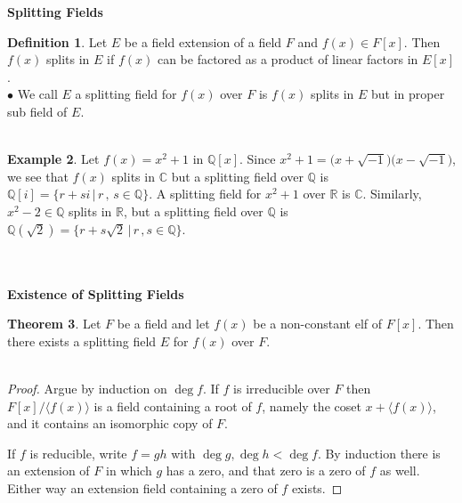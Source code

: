 \documentclass[11pt,a4paper]{article}
\theoremstyle{definition}
\newtheorem{thm}{Theorem}[subsection]
\newtheorem{defn}[thm]{Definition}
\newtheorem{exa}[thm]{Example}
\begin{document}
\textbf{Splitting Fields}\\

\begin{defn}
Let $E$ be a field extension of a field $F$ and $f(x)\in F[x]$. Then $f(x)$ splits in $E$ if $f(x)$ can be factored as a product of linear factors in $E[x]$.\\

$\bullet$ We call $E$ a splitting field for $f(x)$ over $F$ is $f(x)$ splits in $E$  but in proper sub field  of $E$.\\\\
\end{defn}





\begin{exa}
Let $f(x) = x^2 + 1$ in $\mathbb{Q}[x]$. Since $x^2 + 1 = \big(x + \sqrt{-1}\big)\big(x - \sqrt{-1}\big)$, we see that $f(x)$ splits in $\mathbb{C}$ but a splitting field over $\mathbb{Q}$ is $\mathbb{Q}[i] = \{r + si\, |\, r\, , \, s\in \mathbb{Q}\}$. A splitting field for $x^2 + 1$ over $\mathbb{R}$ is $\mathbb{C}$. Similarly, $x^2 - 2\in \mathbb{Q}$ splits in $\mathbb{R}$, but a splitting field over $\mathbb{Q}$ is $\mathbb{Q} (\sqrt{2}) = \{r + s\sqrt{2}\, |\, r\, , s\in \mathbb{Q}\}$.\\\\\\
\end{exa}








\textbf{Existence of Splitting Fields}\\

\begin{thm}
Let $F$ be a field and let $f(x)$ be a non-constant elf of $F[x]$. Then there exists a splitting field $E$ for $f(x)$ over $F$.\\\\
\end{thm}

\begin{proof}
Argue by induction on $\deg f$. If $f$ is irreducible over $F$ then
$F[x]/\langle f(x)\rangle$ is a field containing a root of $f$, namely the coset
$x + \langle f(x)\rangle$, and it contains an isomorphic copy of $F$.

If $f$ is reducible, write $f = gh$ with $\deg g,\deg h < \deg f$. By induction
there is an extension of $F$ in which $g$ has a zero, and that zero is a zero of
$f$ as well. Either way an extension field containing a zero of $f$ exists.
\end{proof}
\end{document}
